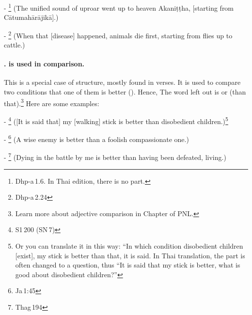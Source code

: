 - \footnote{Dhp-a\,1.6. In Thai edition, there is no  part.} (The unified sound of uproar went up to heaven Akani\d t\d tha, [starting from C\=atumah\=ar\=ajik\=a].)\par
- \footnote{Dhp-a\,2.24} (When that [disease] happened, animals die first, starting from flies up to cattle.)\par

\paragraph*{.  is used in comparison.} This is a special case of  structure, mostly found in verses. It is used to compare two conditions that one of them is better (). Hence, The  word left out is  or  (than that).\footnote{Learn more about adjective comparison in Chapter  of PNL.} Here are some examples:\par
- \footnote{S1\,200 (SN\,7)} ([It is said that] my [walking] stick is better than disobedient children.)\footnote{Or you can translate it in this way: ``In which condition disobedient children [exist], my stick is better than that, it is said. In Thai translation, the  part is often changed to a question, thus ``It is said that my stick is better, what is good about disobedient children?''}\par
- \footnote{Ja\,1:45} (A wise enemy is better than a foolish compassionate one.)\par
- \footnote{Thag\,194} (Dying in the battle by me is better than having been defeated, living.)\par
